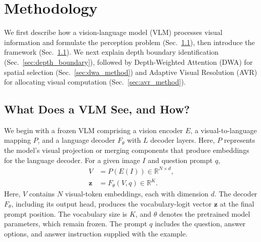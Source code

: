 \documentclass{article} %
\begin{document}


\section{Methodology}
\label{sec:methodology}

We first describe how a vision-language model (VLM) processes visual
information and formulate the perception problem
(Sec.~\ref{sec:vlm_vision}), then introduce the framework
(Sec.~\ref{sec:vlm_vision}). We next explain depth boundary
identification (Sec.~\ref{sec:depth_boundary}), followed by
Depth-Weighted Attention (DWA) for spatial selection
(Sec.~\ref{sec:dwa_method}) and Adaptive Visual Resolution (AVR) for
allocating visual computation (Sec.~\ref{sec:avr_method}).

\subsection{What Does a VLM See, and How?}
\label{sec:vlm_vision}

We begin with a frozen VLM comprising a vision encoder \(E\), a
visual-to-language mapping \(P\), and a language decoder \(F_\theta\)
with \(L\) decoder layers. Here, \(P\) represents the model's visual
projection or merging components that produce embeddings for the
language decoder. For a given image \(I\) and question prompt \(q\),
\begin{align}
    V &= P(E(I)) \in \mathbb{R}^{N\times d}, \\
    \mathbf{z} &= F_\theta(V,q) \in \mathbb{R}^{K}.
\end{align}
Here, \(V\) contains \(N\) visual-token embeddings, each with dimension
\(d\). The decoder \(F_\theta\), including its output head, produces
the vocabulary-logit vector \(\mathbf{z}\) at the final prompt position.
The vocabulary size is \(K\), and \(\theta\) denotes the pretrained model
parameters, which remain frozen. The prompt \(q\) includes the question,
answer options, and answer instruction supplied with the example.
\end{document}
